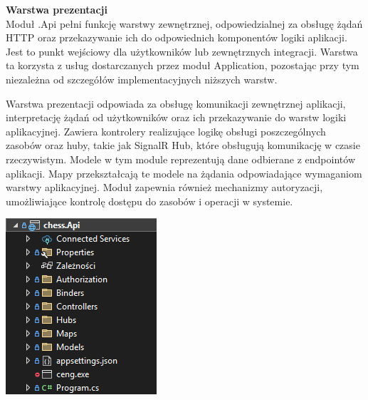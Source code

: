 \documentclass[12pt,a4paper]{article}
\begin{document}
\newpage

\textbf{Warstwa prezentacji}\\
Moduł .Api pełni funkcję warstwy zewnętrznej, odpowiedzialnej za obsługę żądań HTTP oraz przekazywanie ich do odpowiednich komponentów logiki aplikacji. Jest to punkt wejściowy dla użytkowników lub zewnętrznych integracji. Warstwa ta korzysta z usług dostarczanych przez moduł Application, pozostając przy tym niezależna od szczegółów implementacyjnych niższych warstw.

\vspace{0.5cm}
\begin{minipage}[t]{0.45\textwidth}
    \vspace{0pt}
    \raggedright
    Warstwa prezentacji odpowiada za obsługę komunikacji zewnętrznej aplikacji, interpretację żądań od użytkowników oraz ich przekazywanie do warstw logiki aplikacyjnej. Zawiera kontrolery realizujące logikę obsługi poszczególnych zasobów oraz huby, takie jak SignalR Hub, które obsługują komunikację w czasie rzeczywistym. Modele w tym module reprezentują dane odbierane z endpointów aplikacji. Mapy przekształcają te modele na żądania odpowiadające wymaganiom warstwy aplikacyjnej. Moduł zapewnia również mechanizmy autoryzacji, umożliwiające kontrolę dostępu do zasobów i operacji w systemie.
\end{minipage}
\hfill
\begin{minipage}[t]{0.45\textwidth}
    \vspace{0pt}
    \centering
    \includegraphics[width=\linewidth]{zdj/struktura_back_api.png}
\end{minipage}
\vspace{0.5cm}
\end{document}
